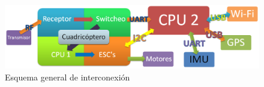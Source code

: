 \documentclass[main]{subfiles}
\begin{document}
\begin{figure}[h!]
  \centering
  \includegraphics[width=1\textwidth]{./pics_general/diagrama_gral.png}
  \caption{Esquema general de interconexi\'on}
  \label{fig:esquema_gral}
\end{figure}
\end{document}
